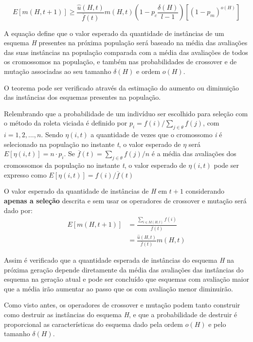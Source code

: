 \begin{equation}
\boxed{ E[m(H,t+1)] \ge \frac{\hat{u}(H,t)}{\overline{f}(t)} m(H,t)\left( 1 - p_c \frac{\delta(H)}{l - 1} \right) \left[(1 - p_m)^{o(H)} \right] }
\label{eq:schema_theorem}
\end{equation}

A equação define que o valor esperado da quantidade de instâncias de  um esquema \textit{H} presentes na próxima população será baseado na média das avaliações das suas instâncias na população comparada com a média das avaliações de todos os cromossomos na população, e também nas probabilidades de crossover e de mutação associadas ao seu tamanho \(\delta(H)\) e ordem \(o(H)\).

O teorema pode ser verificado através da estimação do aumento ou diminuição das instâncias dos esquemas presentes na população. 

Relembrando que a probabilidade de um indivíduo ser escolhido para seleção com o método da roleta viciada é definido por \(p_i = f(i) / \sum_{j \in \theta}{f(j)}\), com \(i = 1,2,\dots,n\). Sendo \(\eta(i,t)\) a quantidade de vezes que o cromossomo \textit{i} é selecionado na população no instante \textit{t}, o valor esperado de \(\eta\) será \(E[\eta(i,t)] = n \cdot p_i\). Se \(\overline{f}(t) = \sum_{j \in \theta} {f(j)} / n\) é a média das avaliações dos cromossomos da população no instante \textit{t}, o valor esperado de \(\eta(i,t)\) pode ser expresso como \(E[\eta(i,t)] = f(i) / \overline{f}(t)\)

O valor esperado da quantidade de instâncias de \textit{H} em \(t+1\) considerando \textbf{apenas a seleção} descrita e sem usar os operadores de crossover e mutação será dado por:
\begin{align}
	E[m(H,t+1)] &= \frac{\sum\limits_{i \in M(H,t)} {f(i)}}{\overline{f}(t)} \nonumber \\
				&= \frac{\hat{u}(H,t)}{\overline{f}(t)} m(H,t)
\label{eq:valor_esperado_H}
\end{align}

Assim é verificado que a quantidade esperada de instâncias do esquema \textit{H} na próxima geração depende diretamente da média das avaliações das instâncias do esquema na geração atual e pode ser concluído que esquemas com avaliação maior que a média irão aumentar ao passo que os com avaliação menor diminuirão.

Como visto antes, os operadores de crossover e mutação podem tanto construir como destruir as instâncias do esquema \textit{H}, e que a probabilidade de destruir é proporcional as características do esquema dado pela ordem \(o(H)\) e pelo tamanho \(\delta(H)\). 

